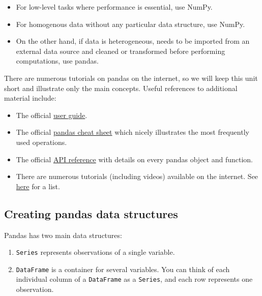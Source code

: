 \documentclass[10pt]{scrartcl}
\providecommand{\tightlist}{%
      \setlength{\itemsep}{0pt}\setlength{\parskip}{0pt}}
\begin{document}
\begin{itemize}
\tightlist
\item
  For low-level tasks where performance is essential, use NumPy.
\item
  For homogenous data without any particular data structure, use NumPy.
\item
  On the other hand, if data is heterogeneous, needs to be imported from
  an external data source and cleaned or transformed before performing
  computations, use pandas.
\end{itemize}

There are numerous tutorials on pandas on the internet, so we will keep
this unit short and illustrate only the main concepts. Useful references
to additional material include:

\begin{itemize}
\tightlist
\item
  The official
  \href{https://pandas.pydata.org/docs/user_guide/index.html}{user
  guide}.
\item
  The official
  \href{https://pandas.pydata.org/Pandas_Cheat_Sheet.pdf}{pandas cheat
  sheet} which nicely illustrates the most frequently used operations.
\item
  The official
  \href{https://pandas.pydata.org/docs/reference/index.html}{API
  reference} with details on every pandas object and function.
\item
  There are numerous tutorials (including videos) available on the
  internet. See
  \href{https://pandas.pydata.org/docs/getting_started/tutorials.html}{here}
  for a list.
\end{itemize}


\hypertarget{creating-pandas-data-structures}{%
\subsection{Creating pandas data
structures}\label{creating-pandas-data-structures}}

Pandas has two main data structures:

\begin{enumerate}
\def\labelenumi{\arabic{enumi}.}
\tightlist
\item
  \texttt{Series} represents observations of a single variable.
\item
  \texttt{DataFrame} is a container for several variables. You can think
  of each individual column of a \texttt{DataFrame} as a
  \texttt{Series}, and each row represents one observation.
\end{enumerate}
\end{document}
